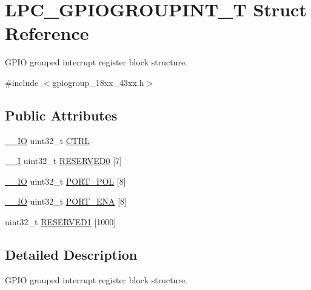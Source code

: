 \hypertarget{struct_l_p_c___g_p_i_o_g_r_o_u_p_i_n_t___t}{}\section{L\+P\+C\+\_\+\+G\+P\+I\+O\+G\+R\+O\+U\+P\+I\+N\+T\+\_\+T Struct Reference}
\label{struct_l_p_c___g_p_i_o_g_r_o_u_p_i_n_t___t}


G\+P\+IO grouped interrupt register block structure.  




{\ttfamily \#include $<$gpiogroup\+\_\+18xx\+\_\+43xx.\+h$>$}

\subsection*{Public Attributes}
\begin{DoxyCompactItemize}
\item 
\hyperlink{core__sc300_8h_aec43007d9998a0a0e01faede4133d6be}{\+\_\+\+\_\+\+IO} uint32\+\_\+t \hyperlink{struct_l_p_c___g_p_i_o_g_r_o_u_p_i_n_t___t_a9a46864f44d2bd9c03f8a45c195e35ed}{C\+T\+RL}
\item 
\hyperlink{core__sc300_8h_af63697ed9952cc71e1225efe205f6cd3}{\+\_\+\+\_\+I} uint32\+\_\+t \hyperlink{struct_l_p_c___g_p_i_o_g_r_o_u_p_i_n_t___t_a4caff08cbbb81225dd5374934754ffeb}{R\+E\+S\+E\+R\+V\+E\+D0} \mbox{[}7\mbox{]}
\item 
\hyperlink{core__sc300_8h_aec43007d9998a0a0e01faede4133d6be}{\+\_\+\+\_\+\+IO} uint32\+\_\+t \hyperlink{struct_l_p_c___g_p_i_o_g_r_o_u_p_i_n_t___t_a31074a965440dd9caf732a0475997f8b}{P\+O\+R\+T\+\_\+\+P\+OL} \mbox{[}8\mbox{]}
\item 
\hyperlink{core__sc300_8h_aec43007d9998a0a0e01faede4133d6be}{\+\_\+\+\_\+\+IO} uint32\+\_\+t \hyperlink{struct_l_p_c___g_p_i_o_g_r_o_u_p_i_n_t___t_a18dcd150f8b272245cda35559c68f2e9}{P\+O\+R\+T\+\_\+\+E\+NA} \mbox{[}8\mbox{]}
\item 
uint32\+\_\+t \hyperlink{struct_l_p_c___g_p_i_o_g_r_o_u_p_i_n_t___t_a227b05eb41dd50f3a906e026de9b427f}{R\+E\+S\+E\+R\+V\+E\+D1} \mbox{[}1000\mbox{]}
\end{DoxyCompactItemize}


\subsection{Detailed Description}
G\+P\+IO grouped interrupt register block structure. 

